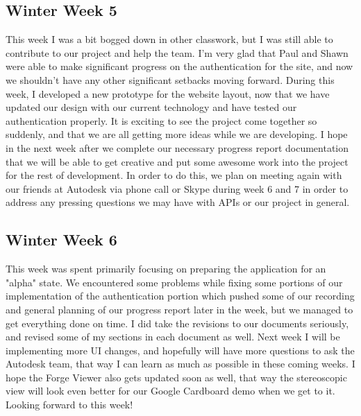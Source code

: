 \documentclass[letterpaper, 10pt, draftclsnofoot, compsoc, onecolumn]{IEEEtran}
\begin{document}
\subsection{Winter Week 5}

This week I was a bit bogged down in other classwork, but I was still able to contribute to our project and help the team. I'm very glad that Paul and Shawn were able to make significant progress on the authentication for the site, and now we shouldn't have any other significant setbacks moving forward. During this week, I developed a new prototype for the website layout, now that we have updated our design with our current technology and have tested our authentication properly. It is exciting to see the project come together so suddenly, and that we are all getting more ideas while we are developing. I hope in the next week after we complete our necessary progress report documentation that we will be able to get creative and put some awesome work into the project for the rest of development. In order to do this, we plan on meeting again with our friends at Autodesk via phone call or Skype during week 6 and 7 in order to address any pressing questions we may have with APIs or our project in general.

\subsection{Winter Week 6}
This week was spent primarily focusing on preparing the application for an "alpha" state. We encountered some problems while fixing some portions of our implementation of the authentication portion which pushed some of our recording and general planning of our progress report later in the week, but we managed to get everything done on time. I did take the revisions to our documents seriously, and revised some of my sections in each document as well. Next week I will be implementing more UI changes, and hopefully will have more questions to ask the Autodesk team, that way I can learn as much as possible in these coming weeks. I hope the Forge Viewer also gets updated soon as well, that way the stereoscopic view will look even better for our Google Cardboard demo when we get to it. Looking forward to this week!
\end{document}
